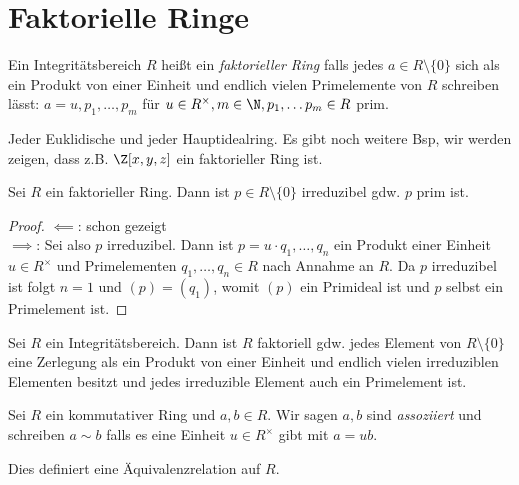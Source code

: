 \section{Faktorielle Ringe}

\begin{definition}
	Ein Integritätsbereich $R$ heißt ein \emph{faktorieller Ring} falls jedes $a \in R \setminus \{0\}$ sich als ein Produkt von einer Einheit
	und endlich vielen Primelemente von $R$ schreiben lässt: $a = u, p_1,\ldots,p_{m}$ für $u \in R^{\times}, m \in \N, p_1,\ldots p_{m} \in R$ prim.
\end{definition}

\begin{eg}
	Jeder Euklidische und jeder Hauptidealring.
	Es gibt noch weitere Bsp, wir werden zeigen, dass z.B. $\Z[x,y,z]$ ein faktorieller Ring ist.
\end{eg}

\begin{proposition}
	Sei $R$ ein faktorieller Ring.
	Dann ist $p \in R \setminus \{0\} $ irreduzibel gdw. $p$ prim ist.
\end{proposition}

\begin{proof}
	$\impliedby$: \checkmark schon gezeigt\\
	$\implies$: Sei also $p$ irreduzibel. Dann ist $p = u \cdot  q_1,\ldots,q_{n}$ ein Produkt einer Einheit
	$u \in R^{\times}$ und Primelementen $q_1,\ldots, q_{n} \in R$ nach Annahme an $R$.
	Da $p$ irreduzibel ist folgt $n =1$ und $(p) = (q_1)$, womit $(p)$ ein Primideal ist und $p$ selbst ein Primelement ist.
\end{proof} 

\begin{corollar}
	Sei $R$ ein Integritätsbereich. Dann ist $R$ faktoriell gdw. jedes Element von $R \setminus \{0\} $ eine Zerlegung als ein Produkt
	von einer Einheit und endlich vielen irreduziblen Elementen besitzt und jedes irreduzible Element auch ein Primelement ist.
\end{corollar}

\begin{definition}
	Sei $R$ ein kommutativer Ring und $a,b \in R$.
	Wir sagen $a,b$ sind \emph{assoziiert} und schreiben $a \sim b$ falls es eine Einheit
	$u \in R^{\times}$ gibt mit $a = u b$.
\end{definition}

\begin{lemma}
	Dies definiert eine Äquivalenzrelation auf $R$.
\end{lemma}

